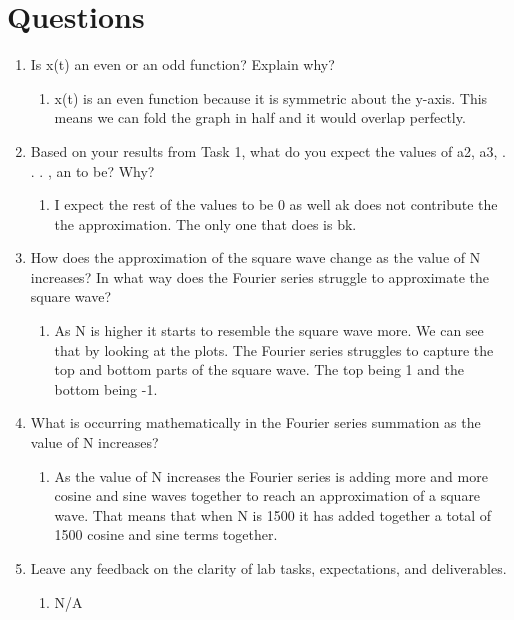 \documentclass[12pt]{article}
\begin{document}
\section{Questions}
\begin{enumerate}
    \item Is x(t) an even or an odd function? Explain why?
    \begin{enumerate}
        \item x(t) is an even function because it is symmetric about the y-axis. This means we can fold the graph in half and it would overlap perfectly.
    \end{enumerate}
    \item Based on your results from Task 1, what do you expect the values of a2, a3, . . . , an to be?
Why?
    \begin{enumerate}
        \item I expect the rest of the values to be 0 as well a\textunderscore k does not contribute the the approximation. The only one that does is b\textunderscore k.
    \end{enumerate}
    \item How does the approximation of the square wave change as the value of N increases? In what
way does the Fourier series struggle to approximate the square wave?
    \begin{enumerate}
        \item As N is higher it starts to resemble the square wave more. We can see that by looking at the plots. The Fourier series struggles to capture the top and bottom parts of the square wave. The top being 1 and the bottom being -1.
    \end{enumerate}
    \item What is occurring mathematically in the Fourier series summation as the value of N increases?
    \begin{enumerate}
        \item As the value of N increases the Fourier series is adding more and more cosine and sine waves together to reach an approximation of a square wave. That means that when N is 1500 it has added together a total of 1500 cosine and sine terms together.
    \end{enumerate}
    \item Leave any feedback on the clarity of lab tasks, expectations, and deliverables.
    \begin{enumerate}
        \item N/A
    \end{enumerate}
\end{enumerate}
\end{document}
